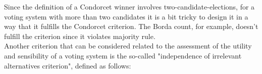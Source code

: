 Since the definition of a Condorcet winner involves two-candidate-elections, for a voting system with more than two candidates it is a bit tricky to design it in a way that it fulfills the Condorcet criterion. The Borda count, for example, doesn't fulfill the criterion since it violates majority rule. \\
Another criterion that can be considered related to the assessment of the utility and sensibility of a voting system is the so-called "independence of irrelevant alternatives criterion", defined as follows: \\
